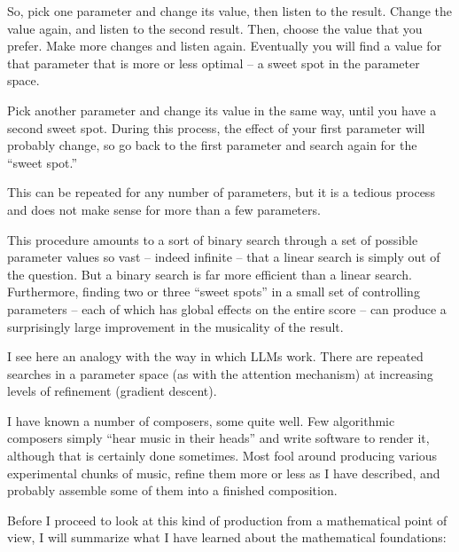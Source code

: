 \documentclass[11pt]{scrartcl}
\begin{document}
So, pick one parameter and change its value, then listen to the result. Change the value again, and listen to the second result. Then, choose the value that you prefer. Make more changes and listen again. Eventually you will find a value for that parameter that is more or less optimal – a sweet spot in the parameter space.

Pick another parameter and change its value in the same way, until you have a second sweet spot. During this process, the effect of your first parameter will probably change, so go back to the first parameter and search again for the “sweet spot.”

This can be repeated for any number of parameters, but it is a tedious process and does not make sense for more than a few parameters.

This procedure amounts to a sort of binary search through a set of possible parameter values so vast – indeed infinite – that a linear search is simply out of the question. But a binary search is far more efficient than a linear search. Furthermore, finding two or three ``sweet spots'' in a small set of controlling parameters – each of which has global effects on the entire score – can produce a surprisingly large improvement in the musicality of the result.

I see here an analogy with the way in which LLMs work. There are repeated searches in a parameter space (as with the attention mechanism) at increasing levels of refinement (gradient descent).

I have known a number of composers, some quite well. Few algorithmic composers simply ``hear music in their heads'' and write software to render it, although that is certainly done sometimes. Most fool around producing various experimental chunks of music, refine them more or less as I have described, and probably assemble some of them into a finished composition.

Before I proceed to look at this kind of production from a mathematical point of view, I will summarize what I have learned about the mathematical foundations:
\end{document}
